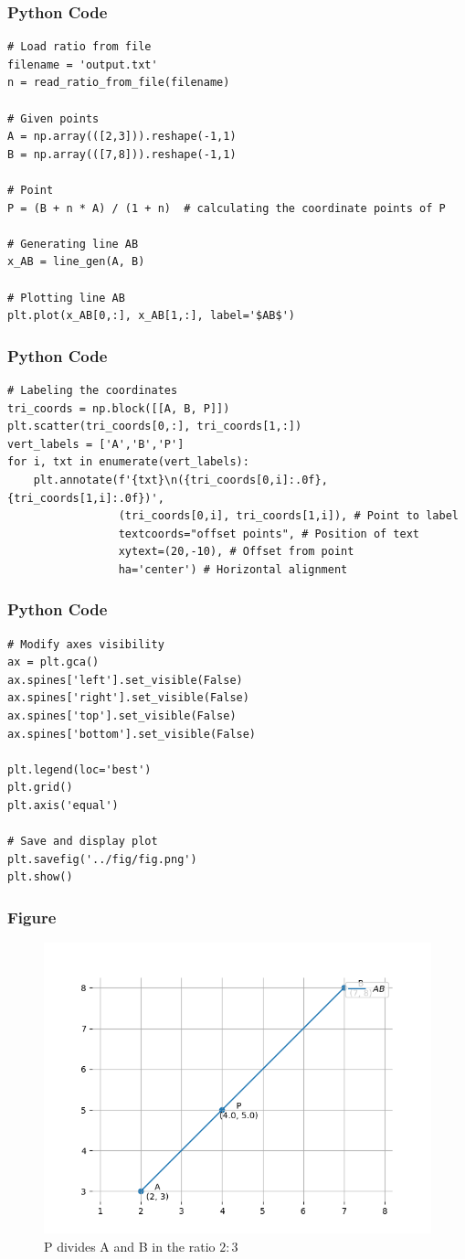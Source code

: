 \documentclass{beamer}
\begin{document}
\begin{frame}[fragile]
  \frametitle{Python Code }

\begin{verbatim}
# Load ratio from file
filename = 'output.txt'
n = read_ratio_from_file(filename)

# Given points
A = np.array(([2,3])).reshape(-1,1)
B = np.array(([7,8])).reshape(-1,1)

# Point
P = (B + n * A) / (1 + n)  # calculating the coordinate points of P

# Generating line AB
x_AB = line_gen(A, B)

# Plotting line AB
plt.plot(x_AB[0,:], x_AB[1,:], label='$AB$')
\end{verbatim}
\end{frame}
\begin{frame}[fragile]
  \frametitle{Python Code }

\begin{verbatim}
# Labeling the coordinates
tri_coords = np.block([[A, B, P]])
plt.scatter(tri_coords[0,:], tri_coords[1,:])
vert_labels = ['A','B','P']
for i, txt in enumerate(vert_labels):
    plt.annotate(f'{txt}\n({tri_coords[0,i]:.0f}, {tri_coords[1,i]:.0f})',
                 (tri_coords[0,i], tri_coords[1,i]), # Point to label
                 textcoords="offset points", # Position of text
                 xytext=(20,-10), # Offset from point
                 ha='center') # Horizontal alignment

\end{verbatim}
\end{frame}
\begin{frame}[fragile]
  \frametitle{Python Code }

\begin{verbatim}
# Modify axes visibility
ax = plt.gca()
ax.spines['left'].set_visible(False)
ax.spines['right'].set_visible(False)
ax.spines['top'].set_visible(False)
ax.spines['bottom'].set_visible(False)

plt.legend(loc='best')
plt.grid() 
plt.axis('equal')

# Save and display plot
plt.savefig('../fig/fig.png')
plt.show()
\end{verbatim}
\end{frame}
\begin{frame}
\frametitle{Figure}
\begin{figure}
    \centering
    \includegraphics[width=0.7\linewidth]{fig/fig.png}
    \caption{P divides A and B in the ratio $2:3$}
    \label{fig:enter-label}
\end{figure}
\end{frame}
\end{document}
